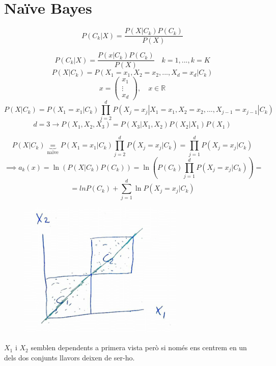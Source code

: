 \documentclass[a4paper]{article}
\begin{document}
\section{Naïve Bayes}
$$
P(C_k|X) = \frac{P(X|C_k)P(C_k)}{P(X)}
$$


$$
P(C_k|X) = \frac{P(x|C_k)P(C_k)}{P(X)} \quad k=1,...,k=K
$$
$$
P(X|C_k) = P(X_1=x_1, X_2=x_2, ..., X_d = x_d|C_k)
$$
$$
x = 
\begin{pmatrix}
x_1 \\ \vdots \\ x_d
\end{pmatrix}, \quad
x \in \mathbb{R}
$$
$$
P(X|C_k) = P(X_1=x_1|C_k)\prod_{j=2}^d P(X_j=x_j|X_1=x_1,X_2=x_2,...,X_{j-1}=x_{j-1}|C_k)
$$
$$
d=3 \rightarrow P(X_1,X_2,X_3) = P(X_3|X_1,X_2)P(X_2|X_1)P(X_1)
$$

$$
P(X|C_k) \underbrace{=}_{\text{naïve}} P(X_1=x_1|C_k) 
\prod_{j=2}^d P(X_j=x_j|C_k) = \prod_{j=1}^d P(X_j=x_j|C_k)
$$
$$
\implies a_k(x) = \ln(P(X|C_k)P(C_k)) = 
\ln\left(P(C_k)\prod_{j=1}^d P(X_j=x_j|C_k)\right) =
$$
$$
= ln P(C_k) + \sum_{j=1}^d \ln P(X_j=x_j|C_k)
$$

\begin{figure}[H]
	\centering
	\includegraphics[width=0.7\textwidth]{images/tema_5-6}
\end{figure}

$X_1$ i $X_2$ semblen dependents a primera vista però si només ens centrem en un dels dos conjunts llavors deixen de ser-ho.
\end{document}
